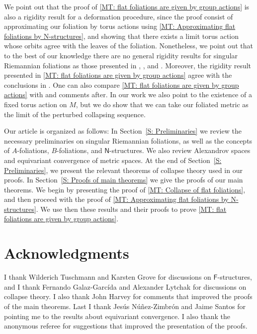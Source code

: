 \documentclass[12pt,a4paper,reqno]{amsart}
\theoremstyle{definition}
\numberwithin{equation}{section}
\newcommand{\F}{\mathsf{F}}
\newcommand{\Ns}{\mathsf{N}}
\begin{document}
We point out that the proof of \th\ref{MT: flat foliations are given by group actions} is also a  rigidity result for a deformation procedure, since the proof consist of approximating our foliation by torus actions using \th\ref{MT: Approximating flat foliations by N-structures}, and showing that there exists a limit torus action whose orbits agree with the leaves of the foliation. Nonetheless, we point out that  to the best of our knowledge there are no general rigidity results for singular Riemannian foliations as those presented in \cite{delHoyoFernandes2019}, \cite{EpsteinRosenberg1977}, and \cite{Hamilton1978}. Moreover, the rigidity result presented in \th\ref{MT: flat foliations are given by group actions} agree with the conclusions in \cite{GroveKarcher1973}. One can also compare \th\ref{MT: flat foliations are given by group actions} with \cite[Proposition 0.8]{PetruninRongTuschmann1999} and comments after. In our work we also point to the existence of a fixed torus action on $M$, but we do show that we can take our foliated metric as the limit of the perturbed collapsing sequence. 

Our article is organized as follows: In Section~\ref{S: Preliminaries} we review the necessary preliminaries on singular Riemannian foliations, as well as the concepts of $A$-foliations, $B$-foliations, and $\Ns$-structures. We also review Alexandrov spaces and equivariant convergence of metric spaces. At the end of Section~\ref{S: Preliminaries}, we present the relevant theorems of collapse theory used in our proofs. In Section~\ref{S: Proofs of main theorems} we give the proofs of our main theorems. We begin by presenting the proof of \th\ref{MT: Collapse of flat foliations}, and then proceed with the proof of \th\ref{MT: Approximating flat foliations by N-structures}. We use then these results and their proofs to  prove  \th\ref{MT: flat foliations are given by group actions}.

\section*{Acknowledgments}

I thank Wilderich Tuschmann and Karsten Grove for discussions on $\F$-structures, and I thank Fernando Galaz-Garcída and Alexander Lytchak for discussions on collapse theory. I also thank John Harvey for comments that improved the proofs of the main theorems. Last I thank Jesús Núñez-Zimbrón and Jaime Santos for pointing me to the results about equivariant convergence. I also thank the anonymous referee for suggestions that improved the presentation of the proofs.
\end{document}
